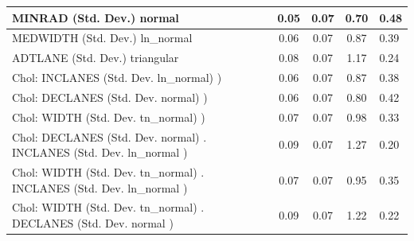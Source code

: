 \begin{table}
\begin{center}
\begin{tabular}{|l|l|c|c|c|l|}
			\hline
			MINRAD (Std. Dev.) normal &  & 0.05 & 0.07 & 0.70 & 0.48 \\
			\hline
			MEDWIDTH (Std. Dev.) ln_normal &  & 0.06 & 0.07 & 0.87 & 0.39 \\
			\hline
			ADTLANE (Std. Dev.) triangular &  & 0.08 & 0.07 & 1.17 & 0.24 \\
			\hline
			 Chol: INCLANES (Std. Dev. ln_normal) ) &  & 0.06 & 0.07 & 0.87 & 0.38 \\
			\hline
			 Chol: DECLANES (Std. Dev. normal) ) &  & 0.06 & 0.07 & 0.80 & 0.42 \\
			\hline
			 Chol: WIDTH (Std. Dev. tn_normal) ) &  & 0.07 & 0.07 & 0.98 & 0.33 \\
			\hline
			 Chol: DECLANES (Std. Dev. normal) . INCLANES (Std. Dev.   ln_normal ) &  & 0.09 & 0.07 & 1.27 & 0.20 \\
			\hline
			 Chol: WIDTH (Std. Dev. tn_normal) . INCLANES (Std. Dev.   ln_normal ) &  & 0.07 & 0.07 & 0.95 & 0.35 \\
			\hline
			 Chol: WIDTH (Std. Dev. tn_normal) . DECLANES (Std. Dev.   normal ) &  & 0.09 & 0.07 & 1.22 & 0.22 \\
			\hline
		\end{tabular}
	\end{center}
\end{table}